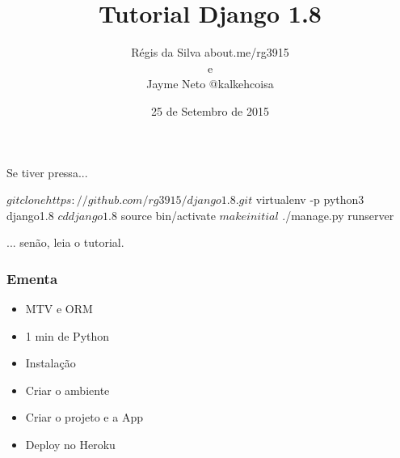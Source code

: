 \documentclass[aspectratio=169]{beamer}
\title{Tutorial Django 1.8}
\author{R\'egis da Silva {\texorpdfstring{\color{blue}}{ }about.me/rg3915}\\ e\\ Jayme Neto \texorpdfstring{\color{blue}}{ }@kalkehcoisa}
\institute{\url{github.com/grupy-sp/encontros}}
\date{25 de Setembro de 2015}
\begin{document}
\justifying %

{%


\begin{frame}

\end{frame}
}

\begin{frame}
	\titlepage
\end{frame}

\begin{frame}[fragile]
	
Se tiver pressa...

\begin{bashcode}
	$ git clone https://github.com/rg3915/django1.8.git
	$ virtualenv -p python3 django1.8
	$ cd django1.8
	$ source bin/activate
	$ make initial
	$ ./manage.py runserver
\end{bashcode}

... sen\~ao, leia o tutorial.

\end{frame}

\begin{frame}\frametitle{Ementa}

\begin{itemize}
	\item MTV e ORM
	\item 1 min de Python
	\item Instala\c c\~ao
	\item Criar o ambiente
	\item Criar o projeto e a App
	\item Deploy no Heroku
\end{itemize}

\end{frame}
\end{document}
